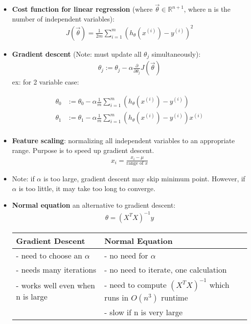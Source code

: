 \documentclass[titlepage]{article}
\begin{document}
\begin{itemize}
	
	
	\item \textbf{Cost function for linear regression} (where $\vec{\theta} \in \mathbb{R}^{n+1}$, where n is the number of independent variables):
	\begin{align*}
	J(\vec\theta) = \frac{1}{2m} \sum_{i=1}^{m}(h_{\theta}(x^{(i)}) - y^{(i)})^2
	\end{align*}
	
	
	\item \textbf{Gradient descent} (Note: must update all $\theta _j$ simultaneously):
	\begin{align*}
	\theta _j := \theta _j - \alpha \frac{\partial}{\partial \theta _j} J(\vec\theta) 
	\end{align*}
	ex: for 2 variable case: 
	
\begin{align*}
\theta_0 &:= \theta _0 - \alpha \frac{1}{m}\sum_{i=1}^{m} (h_\theta(x^{(i)}) - y^{(i)}) \\
\theta _1 &:= \theta _1 - \alpha \frac{1}{m} \sum_{i=1}^{m} (h_\theta (x^{(i)}) - y^{(i)}) x^{(i)} \\
\end{align*}
	

\item \textbf{Feature scaling}: normalizing all independent variables to an appropriate range. Purpose is to speed up gradient descent.
\begin{align*}
x_i = \frac{x_i - \mu}{\textrm{range of } x}
\end{align*}


\item Note: if $\alpha$ is too large, gradient descent may skip minimum point. However, if $\alpha$ is too little, it may take too long to converge.

\item \textbf{Normal equation} an alternative to gradient descent: 
\begin{align*}
\theta = (X^TX)^{-1}y
\end{align*}

\FloatBarrier
\begin{table} [!htbp]
	\centering
	\begin{tabular}{p{5cm}|p{6cm}}
		\textbf{Gradient Descent} & \textbf{Normal Equation}\\
		\hline
		- need to choose an $\alpha$ & - no need for $\alpha$\\
		- needs many iterations & - no need to iterate, one calculation\\
		- works well even when n is large & - need to compute $(X^TX)^{-1}$ which runs in $O(n^3)$ runtime\\
		& - slow if n is very large
	\end{tabular}
	

\end{table}
\end{itemize}
\end{document}
